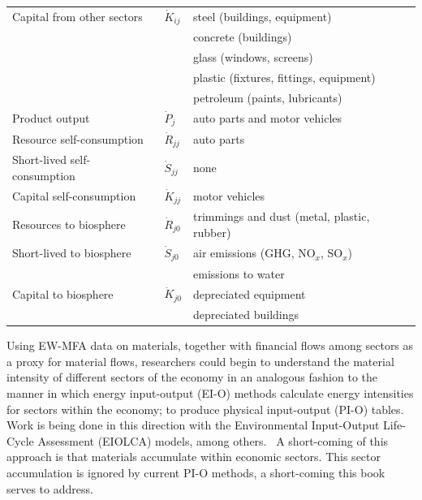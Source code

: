 \begin{table}
\begin{center}
\begin{tabular}{p{4cm}p{1cm}p{5.2cm}}
Capital from other sectors		& $\dot{K}_{ij}$		&	 steel (buildings, equipment)					\\
												&								&	 concrete (buildings)								\\
												&								&	 	glass (windows, screens)						\\
												&								&	 plastic (fixtures, fittings, equipment)		\\
												&								&	 	petroleum (paints, lubricants)				\\
\midrule
Product output							&	$\dot{P}_{j}$		&	auto parts and motor vehicles					\\[0.15cm]
\midrule
Resource self-consumption		&	$\dot{R}_{jj}$		&	auto parts												\\[0.15cm]
Short-lived self-consumption   &	$\dot{S}_{jj}$		&	none 														\\[0.15cm]
Capital self-consumption			&	$\dot{K}_{jj}$		&	motor vehicles											\\[0.15cm]
\midrule
Resources to biosphere			& $\dot{R}_{j0}$		&	trimmings and dust (metal, plastic, rubber)	\\[0.15cm]
Short-lived to biosphere			& $\dot{S}_{j0}$		&	air emissions (GHG, NO$_x$, SO$_x$)		\\
												&								& 	emissions to water									\\[0.15cm]
Capital to biosphere					& $\dot{K}_{j0}$	&	depreciated equipment								\\
												&								& 	depreciated buildings										\\
\bottomrule
\end{tabular}
\end{center}
\label{tab:materials_auto}
\end{table}

Using EW-MFA data on materials,
together with financial flows among sectors
as a proxy for material flows,
researchers could begin to understand the material intensity
of different sectors of the economy in an analogous fashion to
the manner in which energy input-output (EI-O) methods
calculate energy intensities for sectors within the economy;
to produce physical input-output (PI-O) tables.~\cite{Hoekstra2006}
Work is being done in this direction with the 
Environmental Input-Output Life-Cycle Assessment (EIOLCA) models,
among others.~\cite{EIOLCA2014}
A short-coming of this approach is that materials accumulate within economic sectors.
This sector accumulation is ignored by current PI-O methods,
a short-coming this book serves to address.

